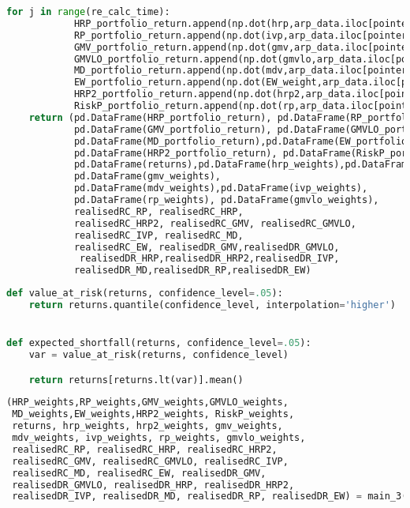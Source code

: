 \begin{lstlisting}[language=Python]
        for j in range(re_calc_time):
            HRP_portfolio_return.append(np.dot(hrp,arp_data.iloc[pointer+j]))
            RP_portfolio_return.append(np.dot(ivp,arp_data.iloc[pointer+j]))
            GMV_portfolio_return.append(np.dot(gmv,arp_data.iloc[pointer+j]))
            GMVLO_portfolio_return.append(np.dot(gmvlo,arp_data.iloc[pointer+j]))
            MD_portfolio_return.append(np.dot(mdv,arp_data.iloc[pointer+j]))
            EW_portfolio_return.append(np.dot(EW_weight,arp_data.iloc[pointer+j]))
            HRP2_portfolio_return.append(np.dot(hrp2,arp_data.iloc[pointer+j]))
            RiskP_portfolio_return.append(np.dot(rp,arp_data.iloc[pointer+j]))
    return (pd.DataFrame(HRP_portfolio_return), pd.DataFrame(RP_portfolio_return), 
            pd.DataFrame(GMV_portfolio_return), pd.DataFrame(GMVLO_portfolio_return), 
            pd.DataFrame(MD_portfolio_return),pd.DataFrame(EW_portfolio_return), 
            pd.DataFrame(HRP2_portfolio_return), pd.DataFrame(RiskP_portfolio_return), 
            pd.DataFrame(returns),pd.DataFrame(hrp_weights),pd.DataFrame(hrp2_weights),
            pd.DataFrame(gmv_weights),
            pd.DataFrame(mdv_weights),pd.DataFrame(ivp_weights),
            pd.DataFrame(rp_weights), pd.DataFrame(gmvlo_weights),
            realisedRC_RP, realisedRC_HRP, 
            realisedRC_HRP2, realisedRC_GMV, realisedRC_GMVLO,
            realisedRC_IVP, realisedRC_MD, 
            realisedRC_EW, realisedDR_GMV,realisedDR_GMVLO,
             realisedDR_HRP,realisedDR_HRP2,realisedDR_IVP,
            realisedDR_MD,realisedDR_RP,realisedDR_EW)

\end{lstlisting}

\begin{lstlisting}[language=Python]
def value_at_risk(returns, confidence_level=.05):
    return returns.quantile(confidence_level, interpolation='higher')


def expected_shortfall(returns, confidence_level=.05):
    var = value_at_risk(returns, confidence_level)

    return returns[returns.lt(var)].mean()
\end{lstlisting}

\begin{lstlisting}[language=Python]
(HRP_weights,RP_weights,GMV_weights,GMVLO_weights,
 MD_weights,EW_weights,HRP2_weights, RiskP_weights,
 returns, hrp_weights, hrp2_weights, gmv_weights, 
 mdv_weights, ivp_weights, rp_weights, gmvlo_weights, 
 realisedRC_RP, realisedRC_HRP, realisedRC_HRP2, 
 realisedRC_GMV, realisedRC_GMVLO, realisedRC_IVP, 
 realisedRC_MD, realisedRC_EW, realisedDR_GMV, 
 realisedDR_GMVLO, realisedDR_HRP, realisedDR_HRP2, 
 realisedDR_IVP, realisedDR_MD, realisedDR_RP, realisedDR_EW) = main_3()
\end{lstlisting}

